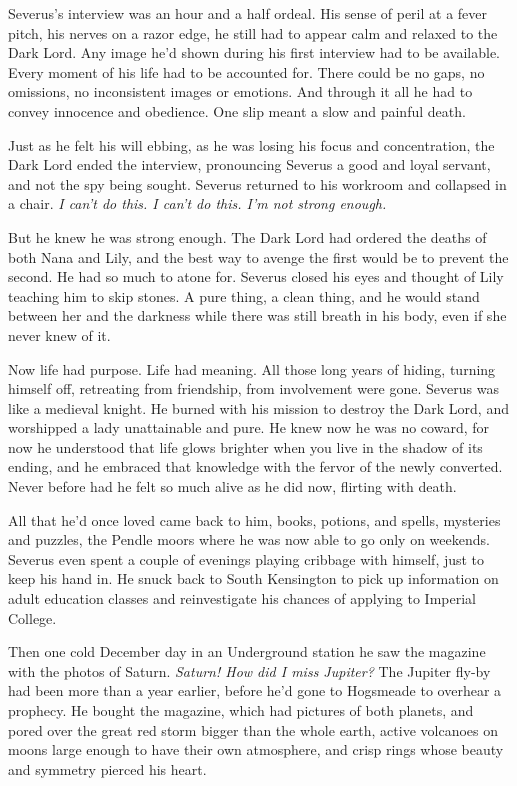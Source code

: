 \documentclass[a4paper,11pt]{article}
\begin{document}
Severus's interview was an hour and a half ordeal. His sense of peril at a fever pitch, his nerves on a razor edge, he still had to appear calm and relaxed to the Dark Lord. Any image he'd shown during his first interview had to be available. Every moment of his life had to be accounted for. There could be no gaps, no omissions, no inconsistent images or emotions. And through it all he had to convey innocence and obedience. One slip meant a slow and painful death.

Just as he felt his will ebbing, as he was losing his focus and concentration, the Dark Lord ended the interview, pronouncing Severus a good and loyal servant, and not the spy being sought. Severus returned to his workroom and collapsed in a chair. \emph{I can't do this. I can't do this. I'm not strong enough.}

But he knew he was strong enough. The Dark Lord had ordered the deaths of both Nana and Lily, and the best way to avenge the first would be to prevent the second. He had so much to atone for. Severus closed his eyes and thought of Lily teaching him to skip stones. A pure thing, a clean thing, and he would stand between her and the darkness while there was still breath in his body, even if she never knew of it.

Now life had purpose. Life had meaning. All those long years of hiding, turning himself off, retreating from friendship, from involvement were gone. Severus was like a medieval knight. He burned with his mission to destroy the Dark Lord, and worshipped a lady unattainable and pure. He knew now he was no coward, for now he understood that life glows brighter when you live in the shadow of its ending, and he embraced that knowledge with the fervor of the newly converted. Never before had he felt so much alive as he did now, flirting with death.

All that he'd once loved came back to him, books, potions, and spells, mysteries and puzzles, the Pendle moors where he was now able to go only on weekends. Severus even spent a couple of evenings playing cribbage with himself, just to keep his hand in. He snuck back to South Kensington to pick up information on adult education classes and reinvestigate his chances of applying to Imperial College.

Then one cold December day in an Underground station he saw the magazine with the photos of Saturn. \emph{Saturn! How did I miss Jupiter?} The Jupiter fly-by had been more than a year earlier, before he'd gone to Hogsmeade to overhear a prophecy. He bought the magazine, which had pictures of both planets, and pored over the great red storm bigger than the whole earth, active volcanoes on moons large enough to have their own atmosphere, and crisp rings whose beauty and symmetry pierced his heart.
\end{document}
